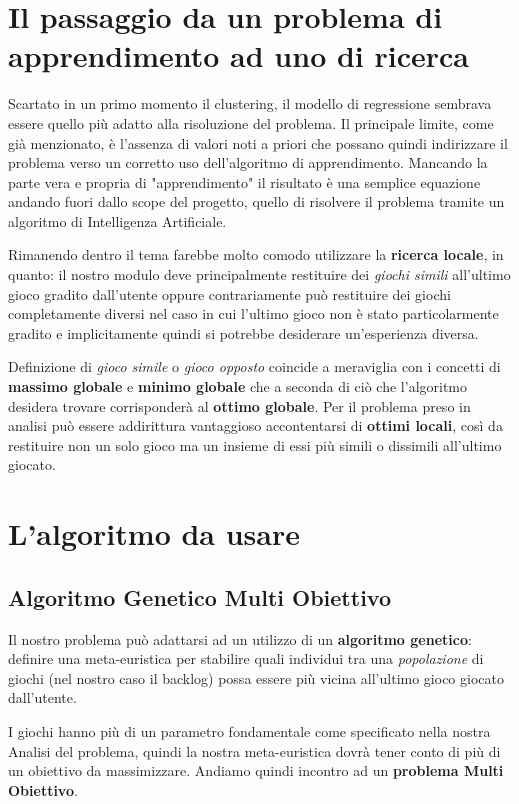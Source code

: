 \section{Il passaggio da un problema di apprendimento ad uno di ricerca}
    Scartato in un primo momento il clustering, il modello di regressione sembrava essere quello più adatto alla risoluzione del problema. Il principale limite, come già menzionato, è l'assenza di valori noti a priori che possano quindi indirizzare il problema verso un corretto uso dell'algoritmo di apprendimento. Mancando la parte vera e propria di "apprendimento" il risultato è una semplice equazione andando fuori dallo scope del progetto, quello di risolvere il problema tramite un algoritmo di Intelligenza Artificiale. 
    
    Rimanendo dentro il tema farebbe molto comodo utilizzare la \textbf{ricerca locale}, in quanto: il nostro modulo deve principalmente restituire dei \textit{giochi simili} all'ultimo gioco gradito dall'utente oppure contrariamente può restituire dei giochi completamente diversi nel caso in cui l'ultimo gioco non è stato particolarmente gradito e implicitamente quindi si potrebbe desiderare un'esperienza diversa.
    
    Definizione di \textit{gioco simile} o \textit{gioco opposto} coincide a meraviglia con i concetti di \textbf{massimo globale} e \textbf{minimo globale} che a seconda di ciò che l'algoritmo desidera trovare corrisponderà al \textbf{ottimo globale}. Per il problema preso in analisi può essere addirittura vantaggioso accontentarsi di \textbf{ottimi locali}, così da restituire non un solo gioco ma un insieme di essi più simili o dissimili all'ultimo giocato.
    
    \section{L'algoritmo da usare}
    \subsection{Algoritmo Genetico Multi Obiettivo}
    Il nostro problema può adattarsi ad un utilizzo di un \textbf{algoritmo genetico}: definire una meta-euristica per stabilire quali individui tra una \textit{popolazione} di giochi (nel nostro caso il backlog) possa essere più vicina all'ultimo gioco giocato dall'utente.
    
    I giochi hanno più di un parametro fondamentale come specificato nella nostra Analisi del problema, quindi la nostra meta-euristica dovrà tener conto di più di un obiettivo da massimizzare. Andiamo quindi incontro ad un \textbf{problema Multi Obiettivo}.
